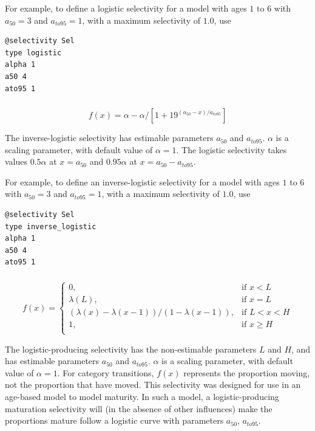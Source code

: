 For example, to define a logistic selectivity for a model with ages $1$ to $6$ with $a_{50}=3$ and $a_{to95}=1$, with a maximum selectivity of $1.0$, use

{\small{\begin{verbatim}
@selectivity Sel
type logistic
alpha 1
a50 4
ato95 1
\end{verbatim}}}

\subsubsection[Inverse logistic]{}

\begin{equation}
  f(x) = \alpha - \alpha / [1+19^{(a_{50}-x)/a_{to95}}]
\end{equation}
 
The inverse-logistic selectivity has estimable parameters $a_{50}$ and $a_{to95}$. $\alpha$ is a scaling parameter, with default value of $\alpha = 1$. The logistic selectivity takes values $0.5 \alpha$ at $x=a_{50}$ and $0.95 \alpha$ at $x=a_{50}-a_{to95}$. 

For example, to define an inverse-logistic selectivity for a model with ages $1$ to $6$ with $a_{50}=3$ and $a_{to95}=1$, with a maximum selectivity of $1.0$, use

{\small{\begin{verbatim}
@selectivity Sel
type inverse_logistic
alpha 1
a50 4
ato95 1
\end{verbatim}}}

\subsubsection[Logistic producing]{}

\begin{equation} 
f(x)=\begin{cases}
	  0, & \text{if $x < L$} \\
	  \lambda(L), & \text{if $x=L$} \\
	  \left( \lambda(x)-\lambda(x-1) \right) / \left( 1-\lambda(x-1) \right), & \text{if $L < x < H$} \\
	  1, & \text{if $x \ge H$} \\  
  \end{cases}
\end{equation}

The logistic-producing selectivity has the non-estimable parameters $L$ and $H$, and has estimable parameters $a_{50}$ and $a_{to95}$. $\alpha$ is a scaling parameter, with default value of $\alpha = 1$. For category transitions, $f(x)$ represents the proportion moving, not the proportion that have moved. This selectivity was designed for use in an age-based model to model maturity. In such a model, a logistic-producing maturation selectivity will (in the absence of other influences) make the proportions mature follow a logistic curve with parameters $a_{50}$, $a_{to95}$.

